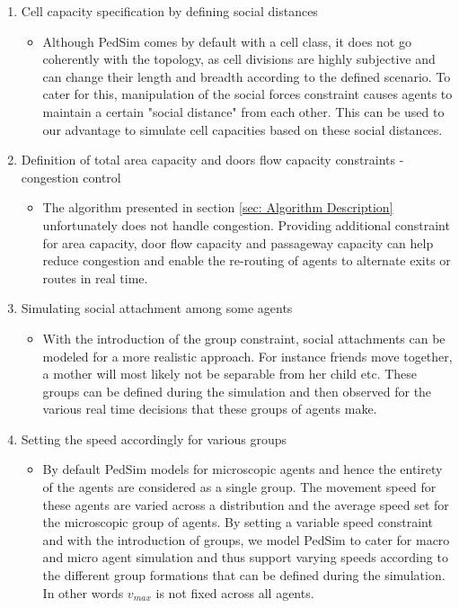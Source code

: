\begin{enumerate}
  \item Cell capacity specification by defining social distances
  \begin{itemize}
  	\item Although PedSim comes by default with a cell class, it does not go coherently with the topology, as cell divisions are highly subjective and can change their length and breadth according to the defined scenario. To cater for this, manipulation of the social forces constraint causes agents to maintain a certain "social distance" from each other. This can be used to our advantage to simulate cell capacities based on these social distances.
  \end{itemize}
  \item Definition of total area capacity and doors flow capacity constraints -congestion control
  \begin{itemize}
  	\item The algorithm presented in section \ref{sec: Algorithm Description} unfortunately does not handle congestion. Providing additional constraint for area capacity, door flow capacity and passageway capacity can help reduce congestion and enable the re-routing of agents to alternate exits or routes in real time.
  \end{itemize}
  \item Simulating social attachment among some agents
  \begin{itemize}
  	\item With the introduction of the group constraint, social attachments can be modeled for a more realistic approach. For instance friends move together, a mother will most likely not be separable from her child etc. These groups can be defined during the simulation and then observed for the various real time decisions that these groups of agents make.
  \end{itemize}
  \item Setting the speed accordingly for various groups
  \begin{itemize}
  	\item By default PedSim models for microscopic agents and hence the entirety of the agents are considered as a single group. The movement speed for these agents are varied across a distribution and the average speed set for the microscopic group of agents. By setting a variable speed constraint and with the introduction of groups, we model PedSim to cater for macro and micro agent simulation and thus support varying speeds according to the different group formations that can be defined during the simulation. In other words $v_{max}$ is not fixed across all agents.
  \end{itemize}
\end{enumerate}

